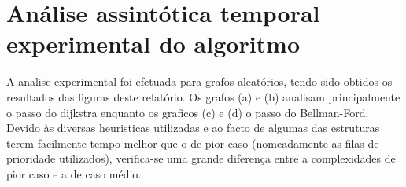 \documentclass{scrartcl}
\begin{document}
\section*{Análise assintótica temporal experimental do algoritmo}
A analise experimental foi efetuada para grafos aleatórios, tendo sido obtidos os resultados das figuras deste relatório. Os grafos (a) e (b) analisam principalmente o passo do dijkstra enquanto os graficos (c) e (d) o passo do Bellman-Ford. Devido às diversas heuristicas utilizadas e ao facto de algumas das estruturas terem facilmente tempo melhor que o de pior caso (nomeadamente as filas de prioridade utilizados), verifica-se uma grande diferença entre a complexidades de pior caso e a de caso médio.

\begin{figure}[H]
	\hfill
\end{figure}
\begin{figure}[H]
	\hfill
\end{figure}




\end{document}
